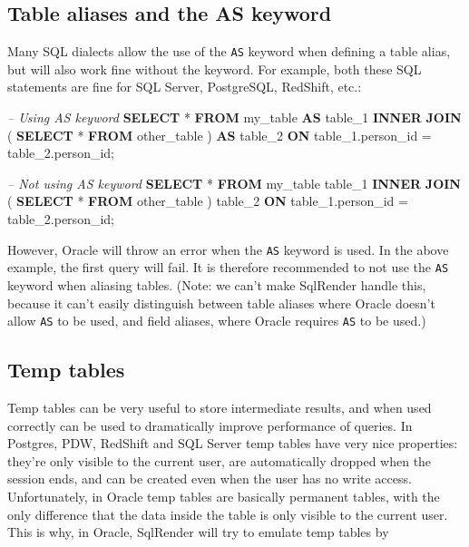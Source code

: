 \documentclass[]{article}
\newenvironment{Shaded}{\begin{snugshade}}{\end{snugshade}}
\newcommand{\CommentTok}[1]{\textcolor[rgb]{0.56,0.35,0.01}{\textit{#1}}}
\newcommand{\DecValTok}[1]{\textcolor[rgb]{0.00,0.00,0.81}{#1}}
\newcommand{\KeywordTok}[1]{\textcolor[rgb]{0.13,0.29,0.53}{\textbf{#1}}}
\newcommand{\NormalTok}[1]{#1}
\begin{document}
\hypertarget{table-aliases-and-the-as-keyword}{%
\subsection{Table aliases and the AS
keyword}\label{table-aliases-and-the-as-keyword}}

Many SQL dialects allow the use of the \texttt{AS} keyword when defining
a table alias, but will also work fine without the keyword. For example,
both these SQL statements are fine for SQL Server, PostgreSQL, RedShift,
etc.:

\begin{Shaded}
\begin{Highlighting}[]
\CommentTok{-- Using AS keyword}
\KeywordTok{SELECT}\NormalTok{ * }
\KeywordTok{FROM}\NormalTok{ my_table }\KeywordTok{AS}\NormalTok{ table_}\DecValTok{1}
\KeywordTok{INNER} \KeywordTok{JOIN}\NormalTok{ (}
  \KeywordTok{SELECT}\NormalTok{ * }\KeywordTok{FROM}\NormalTok{ other_table}
\NormalTok{) }\KeywordTok{AS}\NormalTok{ table_}\DecValTok{2}
\KeywordTok{ON}\NormalTok{ table_1.person_id = table_2.person_id;}

\CommentTok{-- Not using AS keyword}
\KeywordTok{SELECT}\NormalTok{ * }
\KeywordTok{FROM}\NormalTok{ my_table table_}\DecValTok{1}
\KeywordTok{INNER} \KeywordTok{JOIN}\NormalTok{ (}
  \KeywordTok{SELECT}\NormalTok{ * }\KeywordTok{FROM}\NormalTok{ other_table}
\NormalTok{) table_}\DecValTok{2}
\KeywordTok{ON}\NormalTok{ table_1.person_id = table_2.person_id;}
\end{Highlighting}
\end{Shaded}

However, Oracle will throw an error when the \texttt{AS} keyword is
used. In the above example, the first query will fail. It is therefore
recommended to not use the \texttt{AS} keyword when aliasing tables.
(Note: we can't make SqlRender handle this, because it can't easily
distinguish between table aliases where Oracle doesn't allow \texttt{AS}
to be used, and field aliases, where Oracle requires \texttt{AS} to be
used.)

\hypertarget{temp-tables}{%
\subsection{Temp tables}\label{temp-tables}}

Temp tables can be very useful to store intermediate results, and when
used correctly can be used to dramatically improve performance of
queries. In Postgres, PDW, RedShift and SQL Server temp tables have very
nice properties: they're only visible to the current user, are
automatically dropped when the session ends, and can be created even
when the user has no write access. Unfortunately, in Oracle temp tables
are basically permanent tables, with the only difference that the data
inside the table is only visible to the current user. This is why, in
Oracle, SqlRender will try to emulate temp tables by
\end{document}
